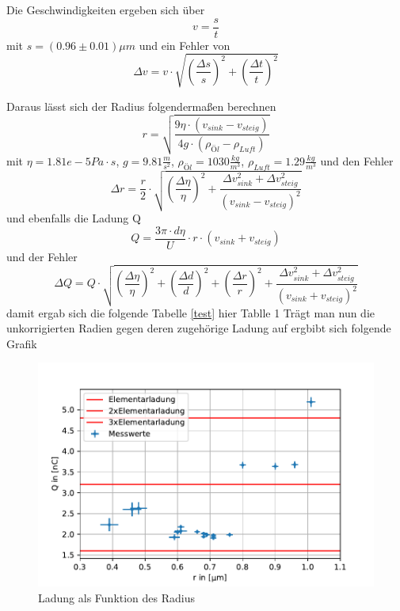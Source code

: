 \documentclass{scrartcl}
\begin{document}
	Die Geschwindigkeiten ergeben sich über
	\begin{equation}
		v = \frac{s}{t}
	\end{equation}
	mit $s = (0.96 \pm 0.01) \mu m$ und ein Fehler von
	\begin{equation}
		\Delta v = v \cdot \sqrt{(\frac{\Delta s}{s})^2 + (\frac{\Delta t}{t})^2} 
	\end{equation}

	Daraus lässt sich der Radius folgendermaßen berechnen
	\begin{equation}
		r = \sqrt{\frac{9\eta \cdot (v_{sink}-v_{steig})}{4 g \cdot (\rho_{Öl}-\rho_{Luft})}}
	\end{equation}
	mit $\eta = 1.81e-5 Pa\cdot s$, $g=9.81 \frac{m}{s^2}$, $\rho_{Öl} = 1030 \frac{kg}{m^3}$, $\rho_{Luft} = 1.29 \frac{kg}{m^3}$
	und den Fehler
	\begin{equation}
		\Delta r = \frac{r}{2} \cdot \sqrt{(\frac{\Delta \eta}{\eta})^2+\frac{\Delta v_{sink}^2+\Delta v_{steig}^2}{(v_{sink}-v_{steig})^2}}
	\end{equation}
	und ebenfalls die Ladung Q
	\begin{equation}
		Q = \frac{3\pi \cdot d\eta}{U} \cdot r \cdot (v_{sink}+v_{steig})
	\end{equation}
	und der Fehler
	\begin{equation}
		\Delta Q = Q \cdot \sqrt{(\frac{\Delta \eta}{\eta})^2 + (\frac{\Delta d}{d})^2+(\frac{\Delta r}{r})^2 + \frac{\Delta v_{sink}^2 + \Delta v_{steig}^2}{(v_{sink} + v_{steig})^2}}
	\end{equation}
	damit ergab sich die folgende Tabelle \ref{test}
	hier Tablle 1
	Trägt man nun die unkorrigierten Radien gegen deren zugehörige Ladung auf ergbibt sich folgende Grafik
	\begin{figure}[H]
		\centering
		\includegraphics[width=1.0\textwidth]{QoverRUncorr.pdf}
		\caption{Ladung als Funktion des Radius}
	\end{figure}
\end{document}
